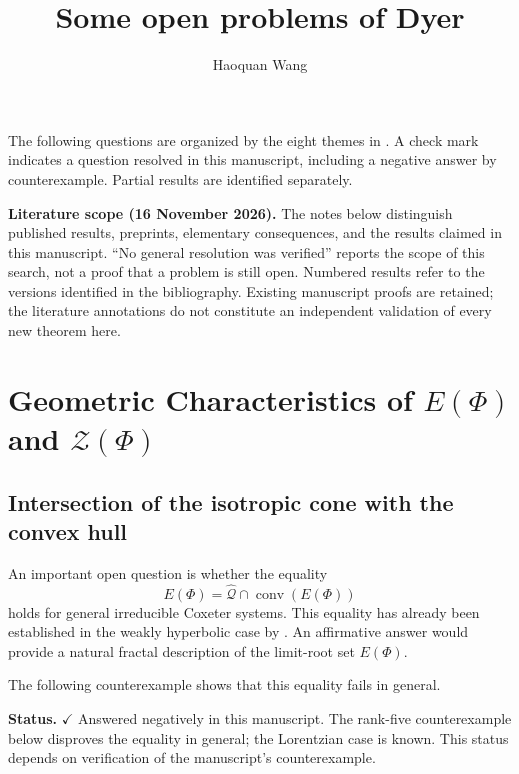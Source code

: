 \documentclass[11pt,reqno]{amsart}
\title[Some open problems of Dyer]
{Some open problems of Dyer}
\author{Haoquan Wang}
\theoremstyle{plain}
\theoremstyle{definition}
\theoremstyle{remark}
\numberwithin{equation}{section}
\begin{document}

\begin{abstract}

\end{abstract}

\maketitle
The following questions are organized by the eight themes in
\cite[Section~7]{DHR}. A check mark indicates a question resolved
in this manuscript, including a negative answer by counterexample.
Partial results are identified separately.

\par\medskip
\noindent\textbf{Literature scope (16 November 2026).}
The notes below distinguish published results, preprints, elementary
consequences, and the results claimed in this manuscript. ``No general
resolution was verified'' reports the scope of this search, not a proof
that a problem is still open. Numbered results refer to the versions
identified in the bibliography. Existing manuscript proofs are retained;
the literature annotations do not constitute an independent validation
of every new theorem here.
\tableofcontents
\section{Geometric Characteristics of \texorpdfstring{$E(\Phi)$}{E(Phi)} and \texorpdfstring{$\mathcal{Z}(\Phi)$}{Z(Phi)}}

\subsection{Intersection of the isotropic cone with the convex hull}

An important open question is whether the equality
\[
E(\Phi)=\widehat{\mathcal{Q}}\cap\operatorname{conv}(E(\Phi))
\]
holds for general irreducible Coxeter systems.
This equality has already been established in the weakly
hyperbolic case by \cite[Theorem~4.10]{DHR}.
An affirmative answer would provide a natural fractal
description of the limit-root set $E(\Phi)$.

The following counterexample shows that this equality fails in general.


\par\medskip
\noindent\textbf{Status.} \(\checkmark\) Answered negatively in this manuscript. The rank-five counterexample below disproves the equality in general; the Lorentzian case is known. This status depends on verification of the manuscript's counterexample.
\end{document}
